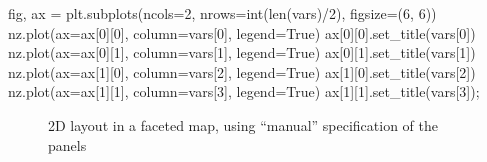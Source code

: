 \documentclass[
  letterpaper,
]{krantz}
\newenvironment{Shaded}{\begin{snugshade}}{\end{snugshade}}
\newcommand{\BuiltInTok}[1]{\textcolor[rgb]{0.00,0.23,0.31}{#1}}
\newcommand{\DecValTok}[1]{\textcolor[rgb]{0.68,0.00,0.00}{#1}}
\newcommand{\NormalTok}[1]{\textcolor[rgb]{0.00,0.23,0.31}{#1}}
\newcommand{\OperatorTok}[1]{\textcolor[rgb]{0.37,0.37,0.37}{#1}}
\newcommand{\VariableTok}[1]{\textcolor[rgb]{0.07,0.07,0.07}{#1}}
\begin{document}
\begin{Shaded}
\begin{Highlighting}[]
\NormalTok{fig, ax }\OperatorTok{=}\NormalTok{ plt.subplots(ncols}\OperatorTok{=}\DecValTok{2}\NormalTok{, nrows}\OperatorTok{=}\BuiltInTok{int}\NormalTok{(}\BuiltInTok{len}\NormalTok{(}\BuiltInTok{vars}\NormalTok{)}\OperatorTok{/}\DecValTok{2}\NormalTok{), figsize}\OperatorTok{=}\NormalTok{(}\DecValTok{6}\NormalTok{, }\DecValTok{6}\NormalTok{))}
\NormalTok{nz.plot(ax}\OperatorTok{=}\NormalTok{ax[}\DecValTok{0}\NormalTok{][}\DecValTok{0}\NormalTok{], column}\OperatorTok{=}\BuiltInTok{vars}\NormalTok{[}\DecValTok{0}\NormalTok{], legend}\OperatorTok{=}\VariableTok{True}\NormalTok{)}
\NormalTok{ax[}\DecValTok{0}\NormalTok{][}\DecValTok{0}\NormalTok{].set\_title(}\BuiltInTok{vars}\NormalTok{[}\DecValTok{0}\NormalTok{])}
\NormalTok{nz.plot(ax}\OperatorTok{=}\NormalTok{ax[}\DecValTok{0}\NormalTok{][}\DecValTok{1}\NormalTok{], column}\OperatorTok{=}\BuiltInTok{vars}\NormalTok{[}\DecValTok{1}\NormalTok{], legend}\OperatorTok{=}\VariableTok{True}\NormalTok{)}
\NormalTok{ax[}\DecValTok{0}\NormalTok{][}\DecValTok{1}\NormalTok{].set\_title(}\BuiltInTok{vars}\NormalTok{[}\DecValTok{1}\NormalTok{])}
\NormalTok{nz.plot(ax}\OperatorTok{=}\NormalTok{ax[}\DecValTok{1}\NormalTok{][}\DecValTok{0}\NormalTok{], column}\OperatorTok{=}\BuiltInTok{vars}\NormalTok{[}\DecValTok{2}\NormalTok{], legend}\OperatorTok{=}\VariableTok{True}\NormalTok{)}
\NormalTok{ax[}\DecValTok{1}\NormalTok{][}\DecValTok{0}\NormalTok{].set\_title(}\BuiltInTok{vars}\NormalTok{[}\DecValTok{2}\NormalTok{])}
\NormalTok{nz.plot(ax}\OperatorTok{=}\NormalTok{ax[}\DecValTok{1}\NormalTok{][}\DecValTok{1}\NormalTok{], column}\OperatorTok{=}\BuiltInTok{vars}\NormalTok{[}\DecValTok{3}\NormalTok{], legend}\OperatorTok{=}\VariableTok{True}\NormalTok{)}
\NormalTok{ax[}\DecValTok{1}\NormalTok{][}\DecValTok{1}\NormalTok{].set\_title(}\BuiltInTok{vars}\NormalTok{[}\DecValTok{3}\NormalTok{])}\OperatorTok{;}
\end{Highlighting}
\end{Shaded}

\begin{figure}[H]


\caption{\label{fig-faceted-map3}2D layout in a faceted map, using
``manual'' specification of the panels}

\end{figure}%
\end{document}
